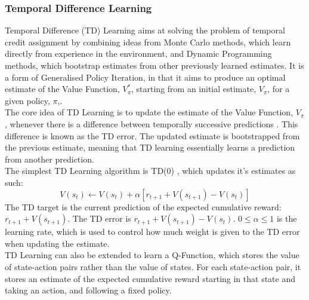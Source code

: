 \subsubsection{Temporal Difference Learning}
Temporal Difference (TD) Learning \cite{10.5555/911176, 5392560, 5391906} aims at solving the problem of temporal credit assignment by combining ideas from Monte Carlo methods, which learn directly from experience in the environment, and Dynamic Programming methods, which bootstrap estimates from other previously learned estimates. It is a form of Generalised Policy Iteration, in that it aims to produce an optimal estimate of the Value Function, $V_\pi^*$, starting from an initial estimate, $V_\pi$, for a given policy, $\pi$,\cite{Sutton1998}.
\\The core idea of TD Learning is to update the estimate of the Value Function, $V_\pi$, whenever there is a difference between temporally successive predictions \cite{Sutton:1988}. This difference is known as the TD error. The updated estimate is bootstrapped from the previous estimate, meaning that TD learning essentially learns a prediction from another prediction.
\\The simplest TD Learning algorithm is TD(0) \cite{Sutton:1988}, which updates it's estimates as such:
\begin{equation}
\label{eqn:td0update}
V(s_t) \leftarrow V(s_t) + \alpha[r_{t+1} + V(s_{t+1}) - V(s_t)]
\end{equation}
The TD target is the current prediction of the expected cumulative reward: $r_{t+1} + V(s_{t+1})$. The TD error is $r_{t+1} + V(s_{t+1}) - V(s_t)$.
$0 \le \alpha \le 1$ is the learning rate, which is used to control how much weight is given to the TD error when updating the estimate. 
\\TD Learning can also be extended to learn a Q-Function, which stores the value of state-action pairs rather than the value of states. For each state-action pair, it stores an estimate of the expected cumulative reward starting in that state and taking an action, and following a fixed policy.


